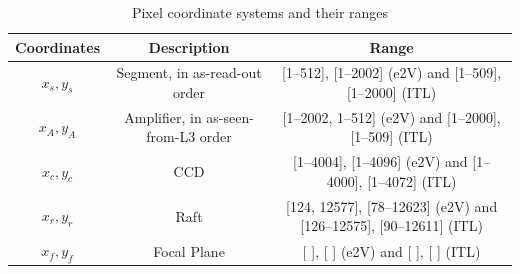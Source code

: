 \documentclass{article}[12pt]
\begin{document}
\begin{table}
\begin{centering}
\begin{tabular}{| c | c | c | }
\hline
{\bf Coordinates} & {\bf Description} & {\bf Range}  \\
\hline
$x_s, y_s$ & Segment, in as-read-out order & [1--512], [1--2002] (e2V) and [1--509], [1--2000] (ITL) \\
$x_A, y_A$ & Amplifier, in as-seen-from-L3 order & [1--2002, 1--512]  (e2V) and [1--2000], [1--509] (ITL) \\
$x_c, y_c$ & CCD & [1--4004], [1--4096] (e2V) and [1--4000], [1--4072] (ITL) \\
$x_r, y_r$ & Raft & [124, 12577], [78--12623] (e2V) and [126--12575], [90--12611] (ITL) \\
$x_f, y_f$ & Focal Plane & [ ], [ ] (e2V) and [ ], [ ] (ITL) \\
\hline
\end{tabular}
\caption{Pixel coordinate systems and their ranges \label{tab:coords}}
\end{centering}
\end{table}
\end{document}
